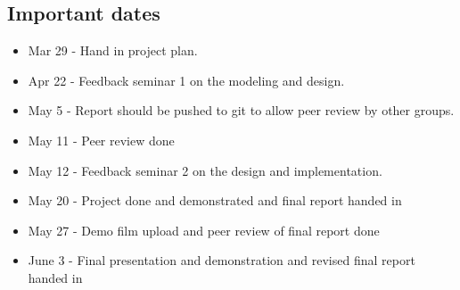 \documentclass{article}
\begin{document}
%        
    
\subsection{Important dates}
    \begin{itemize}
        \item Mar 29 -  Hand in project plan.
        \item Apr 22 - Feedback seminar 1 on the modeling and design.
        \item May 5 - Report should be pushed to git to allow peer review by other groups.
        \item May 11 - Peer review done
        \item May 12 - Feedback seminar 2 on the design and implementation.
        \item May 20 - Project done and demonstrated and final report handed in
        \item May 27 - Demo film upload and peer review of final report done
        \item June 3 - Final presentation and demonstration and revised final report handed in
    \end{itemize}

\end{document}
